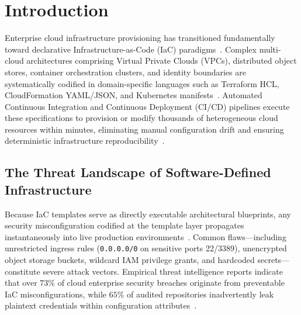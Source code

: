\documentclass[runningheads]{llncs}
\begin{document}
\section{Introduction}
Enterprise cloud infrastructure provisioning has transitioned fundamentally toward declarative Infrastructure-as-Code (IaC) paradigms~\cite{morris2021infrastructure}. Complex multi-cloud architectures comprising Virtual Private Clouds (VPCs), distributed object stores, container orchestration clusters, and identity boundaries are systematically codified in domain-specific languages such as Terraform HCL, CloudFormation YAML/JSON, and Kubernetes manifests~\cite{guerriero2023static,rahman2023threats}. Automated Continuous Integration and Continuous Deployment (CI/CD) pipelines execute these specifications to provision or modify thousands of heterogeneous cloud resources within minutes, eliminating manual configuration drift and ensuring deterministic infrastructure reproducibility~\cite{unit42report}.

\subsection{The Threat Landscape of Software-Defined Infrastructure}
Because IaC templates serve as directly executable architectural blueprints, any security misconfiguration codified at the template layer propagates instantaneously into live production environments~\cite{datadog2024state}. Common flaws---including unrestricted ingress rules (\texttt{0.0.0.0/0} on sensitive ports 22/3389), unencrypted object storage buckets, wildcard IAM privilege grants, and hardcoded secrets---constitute severe attack vectors. Empirical threat intelligence reports indicate that over $73\%$ of cloud enterprise security breaches originate from preventable IaC misconfigurations, while $65\%$ of audited repositories inadvertently leak plaintext credentials within configuration attributes~\cite{unit42report,datadog2024state}.
\end{document}
